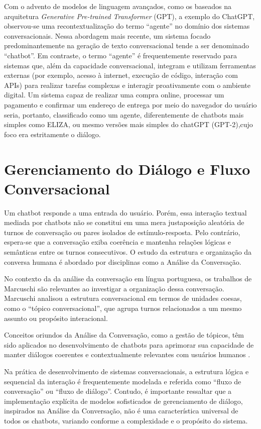 \documentclass[14pt,a4paper,oneside]{book}
\begin{document}
Com o advento de modelos de linguagem avançados, como os baseados na arquitetura \textit{Generative Pre-trained Transformer} (GPT), a exemplo do ChatGPT, observou-se uma recontextualização do termo ``agente'' no domínio dos sistemas conversacionais. Nessa abordagem mais recente, um sistema focado predominantemente na geração de texto conversacional tende a ser denominado ``chatbot''. Em contraste, o termo ``agente'' é frequentemente reservado para sistemas que, além da capacidade conversacional, integram e utilizam ferramentas externas (por exemplo, acesso à internet, execução de código, interação com APIs) para realizar tarefas complexas e interagir proativamente com o ambiente digital. Um sistema capaz de realizar uma compra online, processar um pagamento e confirmar um endereço de entrega por meio do navegador do usuário seria, portanto, classificado como um agente, diferentemente de chatbots mais simples como ELIZA, ou mesmo versões mais simples do chatGPT (GPT-2),cujo foco era estritamente o diálogo.


\section{Gerenciamento do Diálogo e Fluxo Conversacional}

Um chatbot responde a uma entrada do usuário. Porém, essa interação textual mediada por chatbots não se constitui em uma mera justaposição aleatória de turnos de conversação ou pares isolados de estímulo-resposta. Pelo contrário, espera-se que a conversação exiba coerência e mantenha relações lógicas e semânticas entre os turnos consecutivos. O estudo da estrutura e organização da conversa humana é abordado por disciplinas como a Análise da Conversação.

No contexto da da análise da conversação em língua portuguesa, os trabalhos de Marcuschi \cite{Marchuschi1986} são relevantes ao investigar a organização dessa conversação. Marcuschi analisou a estrutura conversacional em termos de unidades coesas, como o ``tópico conversacional'', que agrupa turnos relacionados a um mesmo assunto ou propósito interacional.

Conceitos oriundos da Análise da Conversação, como a gestão de tópicos, têm sido aplicados no desenvolvimento de chatbots para aprimorar sua capacidade de manter diálogos coerentes e contextualmente relevantes com usuários humanos \cite{Neves2005}.

Na prática de desenvolvimento de sistemas conversacionais, a estrutura lógica e sequencial da interação é frequentemente modelada e referida como ``fluxo de conversação'' ou ``fluxo de diálogo''. Contudo, é importante ressaltar que a implementação explícita de modelos sofisticados de gerenciamento de diálogo, inspirados na Análise da Conversação, não é uma característica universal de todos os chatbots, variando conforme a complexidade e o propósito do sistema. 
\end{document}
